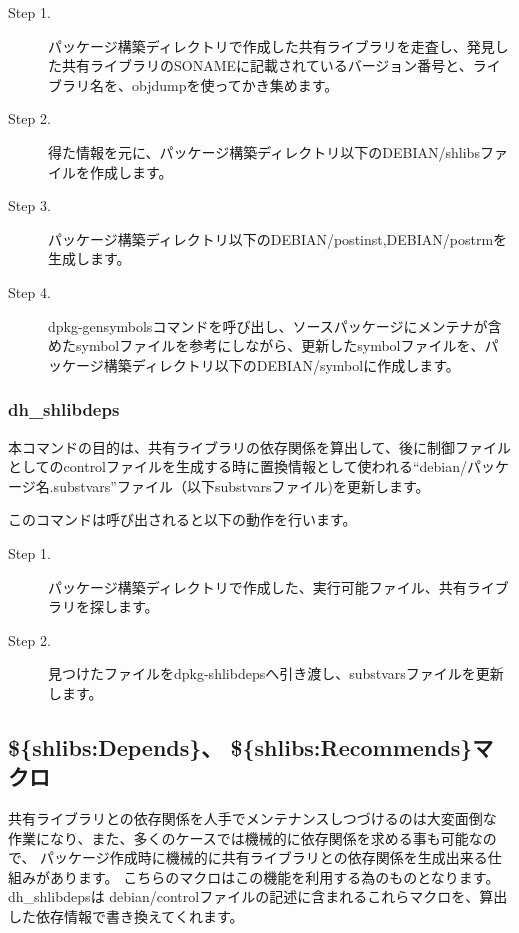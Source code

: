 \documentclass[mingoth,a4paper]{jsarticle}
\begin{document}
\begin{description}
\item [Step 1.] パッケージ構築ディレクトリで作成した共有ライブラリを走査し、発見した共有ライブラリのSONAMEに記載されているバージョン番号と、ライブラリ名を、objdumpを使ってかき集めます。
\item [Step 2.] 得た情報を元に、パッケージ構築ディレクトリ以下のDEBIAN/shlibsファイルを作成します。
\item [Step 3.] パッケージ構築ディレクトリ以下のDEBIAN/postinst,DEBIAN/postrmを生成します。
\item [Step 4.] dpkg-gensymbolsコマンドを呼び出し、ソースパッケージにメンテナが含めたsymbolファイルを参考にしながら、更新したsymbolファイルを、パッケージ構築ディレクトリ以下のDEBIAN/symbolに作成します。
\end{description}

\subsubsection{dh\_shlibdeps}

 本コマンドの目的は、共有ライブラリの依存関係を算出して、後に制御ファイルとしてのcontrolファイルを生成する時に置換情報として使われる``debian/パッケージ名.substvars''ファイル（以下substvarsファイル)を更新します。

このコマンドは呼び出されると以下の動作を行います。

\begin{description}
\item [Step 1.] パッケージ構築ディレクトリで作成した、実行可能ファイル、共有ライブラリを探します。
\item [Step 2.] 見つけたファイルをdpkg-shlibdepsへ引き渡し、substvarsファイルを更新します。
\end{description}


\subsection{\$\{shlibs:Depends\}、 \$\{shlibs:Recommends\}マクロ}

 共有ライブラリとの依存関係を人手でメンテナンスしつづけるのは大変面倒な
作業になり、また、多くのケースでは機械的に依存関係を求める事も可能なので、
パッケージ作成時に機械的に共有ライブラリとの依存関係を生成出来る仕組みがあります。
こちらのマクロはこの機能を利用する為のものとなります。 dh\_shlibdepsは
debian/controlファイルの記述に含まれるこれらマクロを、算出した依存情報で書き換えてくれます。
\end{document}
